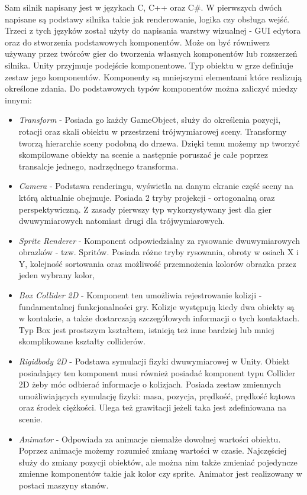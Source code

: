 \documentclass[a4paper,12pt,twoside,openany]{report}
\begin{document}
Sam silnik napisany jest w językach C, C++ oraz C\#. W pierwszych dwóch napisane są podstawy silnika takie jak renderowanie, logika czy obsługa wejść. Trzeci z tych języków został użyty do napisania warstwy wizualnej - GUI edytora oraz do stworzenia podstawowych komponentów. Może on być równiwerz używany przez twórców gier do tworzenia własnych komponentów lub rozszerzeń silnika. Unity przyjmuje podejście komponentowe. Typ obiektu w grze definiuje zestaw jego komponentów. Komponenty są mniejszymi elementami które realizują określone zdania. Do podstawowych typów komponentów można zaliczyć miedzy innymi:
\begin{itemize}
    \item \textit{Transform} - Posiada go każdy GameObject, służy do określenia pozycji, rotacji oraz skali obiektu w przestrzeni trójwymiarowej sceny. Transformy tworzą hierarchie sceny podobną do drzewa. Dzięki temu możemy np tworzyć skompilowane obiekty na scenie a następnie poruszać je całe poprzez transalcje jednego, nadrzędnego transforma.
    \item \textit{Camera} - Podstawa renderingu, wyświetla na danym ekranie część sceny na którą aktualnie obejmuje. Posiada 2 tryby projekcji - ortogonalną oraz perspektywiczną. Z zasady pierwszy typ wykorzystywany jest dla gier dwuwymiarowych natomiast drugi dla trójwymiarowych.
    \item \textit{Sprite Renderer} - Komponent odpowiedzialny za rysowanie dwuwymiarowych obrazków - tzw. Spritów. Posiada różne tryby rysowania, obroty w osiach X i Y, kolejność sortowania oraz możliwość przemnożenia kolorów obrazka przez jeden wybrany kolor,
    \item \textit{Box Collider 2D} - Komponent ten umożliwia rejestrowanie kolizji - fundamentalnej funkcjonalności gry. Kolizje występują kiedy dwa obiekty są w kontakcie, a także dostarczają szczegółowych informacji o tych kontaktach. Typ Box jest prostszym kształtem, istnieją też inne bardziej lub mniej skomplikowane kształty colliderów.
    \item \textit{Rigidbody 2D} - Podstawa symulacji fizyki dwuwymiarowej w Unity. Obiekt posiadający ten komponent musi również posiadać komponent typu Collider 2D żeby móc odbierać informacje o kolizjach. Posiada zestaw zmiennych umożliwiających symulację fizyki: masa, pozycja, prędkość, prędkość kątowa oraz środek ciężkości. Ulega też grawitacji jeżeli taka jest zdefiniowana na scenie.
    \item \textit{Animator} - Odpowiada za animacje niemalże dowolnej wartości obiektu. Poprzez animacje możemy rozumieć zmianę wartości w czasie. Najczęściej służy do zmiany pozycji obiektów, ale można nim także zmieniać pojedyncze zmienne komponentów takie jak kolor czy sprite. Animator jest realizowany w postaci maszyny stanów.

\end{itemize}
\end{document}
